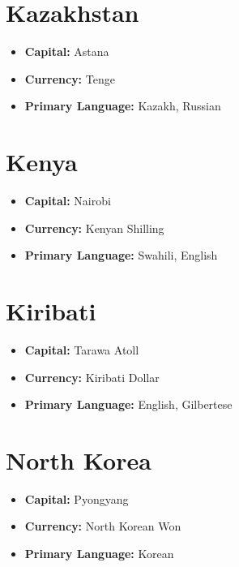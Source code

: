 \documentclass[a4paper,100pt,twoside]{book}
\begin{document}
\section*{\Huge Kazakhstan}
\vspace{5mm} %
\begin{itemize}
	\item \textbf{Capital:} Astana
	\item \textbf{Currency:} Tenge
	\item \textbf{Primary Language:} Kazakh, Russian
\end{itemize}

\section*{\Huge Kenya}
\vspace{5mm} %
\begin{itemize}
	\item \textbf{Capital:} Nairobi
	\item \textbf{Currency:} Kenyan Shilling
	\item \textbf{Primary Language:} Swahili, English
\end{itemize}

\section*{\Huge Kiribati}
\vspace{5mm} %
\begin{itemize}
	\item \textbf{Capital:} Tarawa Atoll
	\item \textbf{Currency:} Kiribati Dollar
	\item \textbf{Primary Language:} English, Gilbertese
\end{itemize}

\section*{\Huge North Korea}
\vspace{5mm} %
\begin{itemize}
	\item \textbf{Capital:} Pyongyang
	\item \textbf{Currency:} North Korean Won
	\item \textbf{Primary Language:} Korean
\end{itemize}
\end{document}
